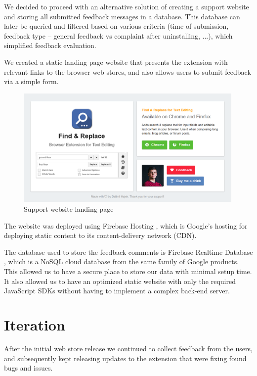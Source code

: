 \documentclass[bsc,frontabs,twoside,singlespacing,parskip,deptreport]{infthesis}
\begin{document}
We decided to proceed with an alternative solution of creating a support website and storing all submitted feedback messages in a database. This database can later be queried and filtered based on various criteria (time of submission, feedback type -- general feedback vs complaint after uninstalling, ...), which simplified feedback evaluation.

We created a static landing page website that presents the extension with relevant links to the browser web stores, and also allows users to submit feedback via a simple form.

\begin{figure}[h]
\centering
\includegraphics[width=0.99\textwidth]{../graphics/landing-page.png}
\caption{Support website landing page}
\end{figure}

The website was deployed using Firebase Hosting \cite{A8}, which is Google's hosting for deploying static content to its content-delivery network (CDN).

The database used to store the feedback comments is Firebase Realtime Database \cite{A9}, which is a NoSQL cloud database from the same family of Google products. This allowed us to have a secure place to store our data with minimal setup time. It also allowed us to have an optimized static website with only the required JavaScript SDKs without having to implement a complex back-end server.

\section{Iteration}
After the initial web store release we continued to collect feedback from the users, and subsequently kept releasing updates to the extension that were fixing found bugs and issues.

\end{document}
